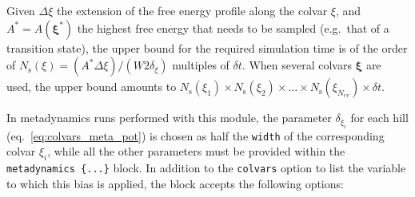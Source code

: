 Given $\Delta\xi$ the extension of the free energy profile along the
colvar $\xi$, and $A^{*}=A(\bm{\xi}^{*})$ the highest free energy that
needs to be sampled (e.g.~that of a transition state), the upper bound
for the required simulation time is of the order of
$N_{\mathrm{s}}(\xi) = (A^{*}\Delta\xi)/(W2\delta_{\xi})$ multiples of
$\delta{}t$.  When several colvars $\bm{\xi}$ are used, the upper
bound amounts to $N_{\mathrm{s}}(\xi_{1}) \times
N_{\mathrm{s}}(\xi_{2}) \times \ldots \times
N_{\mathrm{s}}(\xi_{N_{\mathrm{cv}}}) \times \delta{}t$.

In metadynamics runs performed with this module, the parameter
$\delta_{\xi_{i}}$ for each hill (eq.~\ref{eq:colvars_meta_pot}) is
chosen as half the \texttt{width} of the corresponding colvar
$\xi_{i}$, while all the other parameters must be provided within the
\texttt{metadynamics~\{...\}} block.  In addition to the
\texttt{colvars} option to list the variable to which this bias is
applied, the block accepts the following options:

